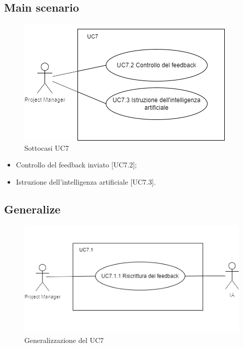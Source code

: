 \documentclass{article}
\begin{document}
    \subsection*{Main scenario}
        \begin{figure}[h]
            \centering
            \includegraphics{./imgUML/UC7-zoom.png}
            \caption{Sottocasi UC7}
            \label{fig:UC7_sottocasi}
        \end{figure}
        \begin{itemize}
            \item Controllo del feedback inviato [UC7.2];
            \item Istruzione dell'intelligenza artificiale [UC7.3].
        \end{itemize}
        
    \subsection*{Generalize}
      \begin{figure}[h]
            \centering
            \includegraphics{./imgUML/UC7-zoom1.png}
            \caption{Generalizzazione del UC7}
            \label{fig:UC7_generalizzazione}
        \end{figure}
\end{document}
